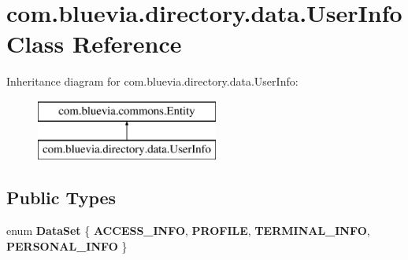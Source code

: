 \hypertarget{classcom_1_1bluevia_1_1directory_1_1data_1_1UserInfo}{
\section{com.bluevia.directory.data.UserInfo Class Reference}
\label{classcom_1_1bluevia_1_1directory_1_1data_1_1UserInfo}
}
Inheritance diagram for com.bluevia.directory.data.UserInfo:\begin{figure}[H]
\begin{center}
\leavevmode
\includegraphics[height=2.000000cm]{classcom_1_1bluevia_1_1directory_1_1data_1_1UserInfo}
\end{center}
\end{figure}
\subsection*{Public Types}
\begin{DoxyCompactItemize}
\item 
enum {\bfseries DataSet} \{ {\bfseries ACCESS\_\-INFO}, 
{\bfseries PROFILE}, 
{\bfseries TERMINAL\_\-INFO}, 
{\bfseries PERSONAL\_\-INFO}
 \}
\end{DoxyCompactItemize}
